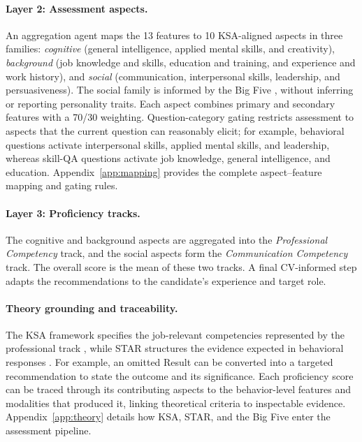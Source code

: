 \documentclass[11pt]{article}
\begin{document}
\paragraph{Layer 2: Assessment aspects.} An aggregation agent maps the 13 features to 10 KSA-aligned aspects in three families: \emph{cognitive} (general intelligence, applied mental skills, and creativity), \emph{background} (job knowledge and skills, education and training, and experience and work history), and \emph{social} (communication, interpersonal skills, leadership, and persuasiveness). The social family is informed by the Big Five \citep{mccrae1987validation}, without inferring or reporting personality traits. Each aspect combines primary and secondary features with a 70/30 weighting. Question-category gating restricts assessment to aspects that the current question can reasonably elicit; for example, behavioral questions activate interpersonal skills, applied mental skills, and leadership, whereas skill-QA questions activate job knowledge, general intelligence, and education. Appendix~\ref{app:mapping} provides the complete aspect--feature mapping and gating rules.

\paragraph{Layer 3: Proficiency tracks.} The cognitive and background aspects are aggregated into the \emph{Professional Competency} track, and the social aspects form the \emph{Communication Competency} track. The overall score is the mean of these two tracks. A final CV-informed step adapts the recommendations to the candidate's experience and target role.

\paragraph{Theory grounding and traceability.} The KSA framework specifies the job-relevant competencies represented by the professional track \citep{peterson2001onet}, while STAR structures the evidence expected in behavioral responses \citep{janz1982behavior}. For example, an omitted Result can be converted into a targeted recommendation to state the outcome and its significance. Each proficiency score can be traced through its contributing aspects to the behavior-level features and modalities that produced it, linking theoretical criteria to inspectable evidence. Appendix~\ref{app:theory} details how KSA, STAR, and the Big Five enter the assessment pipeline.
\end{document}
